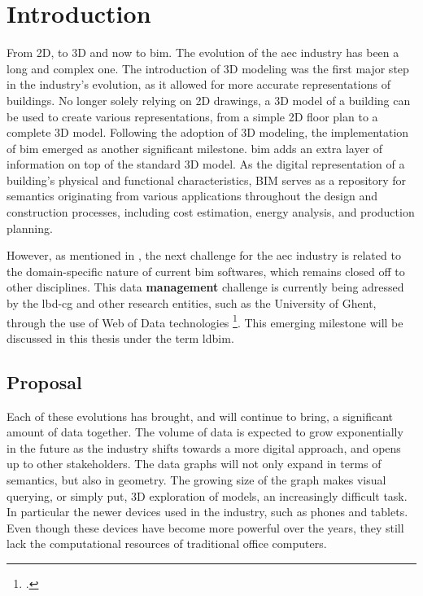 \chapter{Introduction} \label{ch:introduction}
From 2D, to 3D and now to \acs{bim}. The evolution of the \ac{aec} industry has been a long and complex one. The introduction of 3D modeling was the first major step in the industry's evolution, as it allowed for more accurate representations of buildings. No longer solely relying on 2D drawings, a 3D model of a building can be used to create various representations, from a simple 2D floor plan to a complete 3D model. Following the adoption of 3D modeling, the implementation of \ac{bim} emerged as another significant milestone. \ac{bim} adds an extra layer of information on top of the standard 3D model. As the digital representation of a building's physical and functional characteristics, BIM serves as a repository for semantics originating from various applications throughout the design and construction processes, including cost estimation, energy analysis, and production planning.

\label{sec:intro}
However, as mentioned in \cite{Werbrouck2018}, the next challenge for the \ac{aec} industry is related to the domain-specific nature of current \ac{bim} softwares, which remains closed off to other disciplines. This data \textbf{management} challenge is currently being adressed by the \ac{lbd-cg} and other research entities, such as the University of Ghent, through the use of Web of Data technologies \footcite{ldbimGroup}. This emerging milestone will be discussed in this thesis under the term \ac{ldbim}.

\section{Proposal} \label{sec:proposal}
Each of these evolutions has brought, and will continue to bring, a significant amount of data together. The volume of data is expected to grow exponentially in the future as the industry shifts towards a more digital approach, and opens up to other stakeholders. The data graphs will not only expand in terms of semantics, but also in geometry. The growing size of the graph makes visual querying, or simply put, 3D exploration of models, an increasingly difficult task. In particular the newer devices used in the industry, such as phones and tablets. Even though these devices have become more powerful over the years, they still lack the computational resources of traditional office computers.

